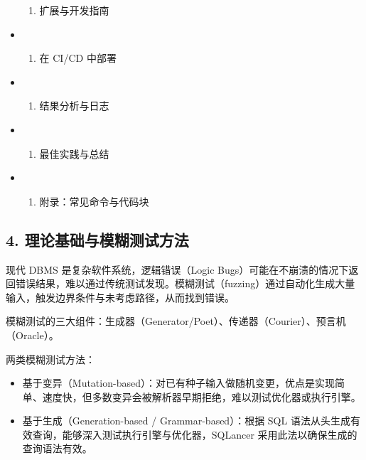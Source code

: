 \documentclass[
]{article}
\providecommand{\tightlist}{%
  \setlength{\itemsep}{0pt}\setlength{\parskip}{0pt}}
\begin{document}
\begin{itemize}
\begin{enumerate}
  \tightlist
  \item
    扩展与开发指南
  \end{enumerate}
\item
  \begin{enumerate}
  \def\labelenumi{\arabic{enumi}.}
  \setcounter{enumi}{9}
  \tightlist
  \item
    在 CI/CD 中部署
  \end{enumerate}
\item
  \begin{enumerate}
  \def\labelenumi{\arabic{enumi}.}
  \setcounter{enumi}{10}
  \tightlist
  \item
    结果分析与日志
  \end{enumerate}
\item
  \begin{enumerate}
  \def\labelenumi{\arabic{enumi}.}
  \setcounter{enumi}{11}
  \tightlist
  \item
    最佳实践与总结
  \end{enumerate}
\item
  \begin{enumerate}
  \def\labelenumi{\arabic{enumi}.}
  \setcounter{enumi}{12}
  \tightlist
  \item
    附录：常见命令与代码块
  \end{enumerate}
\end{itemize}

\subsection{4.
理论基础与模糊测试方法}\label{ux7406ux8bbaux57faux7840ux4e0eux6a21ux7ccaux6d4bux8bd5ux65b9ux6cd5}

现代 DBMS 是复杂软件系统，逻辑错误（Logic
Bugs）可能在不崩溃的情况下返回错误结果，难以通过传统测试发现。模糊测试（fuzzing）通过自动化生成大量输入，触发边界条件与未考虑路径，从而找到错误。

模糊测试的三大组件：生成器（Generator/Poet）、传递器（Courier）、预言机（Oracle）。

两类模糊测试方法：

\begin{itemize}
\tightlist
\item
  基于变异（Mutation-based）：对已有种子输入做随机变更，优点是实现简单、速度快，但多数变异会被解析器早期拒绝，难以测试优化器或执行引擎。
\item
  基于生成（Generation-based / Grammar-based）：根据 SQL
  语法从头生成有效查询，能够深入测试执行引擎与优化器，SQLancer
  采用此法以确保生成的查询语法有效。
\end{itemize}
\end{document}

